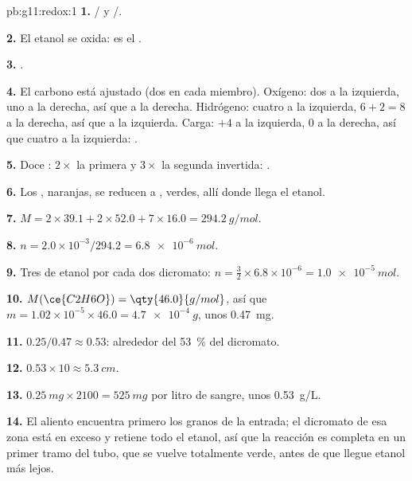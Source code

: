 \begin{solution}{pb:g11:redox:1}
\textbf{1.} / y /.

\textbf{2.} El etanol se oxida: es el .

\textbf{3.} .

\textbf{4.} El carbono está ajustado (dos en cada miembro). Oxígeno:
dos a la izquierda, uno a la derecha, así que  a la derecha.
Hidrógeno: cuatro a la izquierda, $6 + 2 = 8$ a la derecha, así que
 a la izquierda. Carga: $+4$ a la izquierda, 0 a la derecha,
así que cuatro  a la izquierda:
.

\textbf{5.} Doce : $2\times$ la primera y $3\times$ la segunda
invertida:
.

\textbf{6.} Los  , naranjas, se reducen a 
, verdes, allí donde llega el etanol.

\textbf{7.} $M = 2\times 39.1 + 2\times 52.0 + 7\times 16.0 =
\qty{294.2}{g/mol}$.

\textbf{8.} $n = 2.0\times 10^{-3}/294.2 = \qty{6.8e-6}{mol}$.

\textbf{9.} Tres  de etanol por cada dos  dicromato:
$n = \tfrac{3}{2}\times 6.8\times 10^{-6} = \qty{1.0e-5}{mol}$.

\textbf{10.} $M(\ce{C2H6O}) = \qty{46.0}{g/mol}$, así que
$m = 1.02\times 10^{-5}\times 46.0 = \qty{4.7e-4}{g}$, unos
\qty{0.47}{mg}.

\textbf{11.} $0.25/0.47 \approx 0.53$: alrededor del \qty{53}{\percent}
del dicromato.

\textbf{12.} $0.53 \times 10 \approx \qty{5.3}{cm}$.

\textbf{13.} $\qty{0.25}{mg} \times 2100 = \qty{525}{mg}$ por litro de
sangre, unos \qty{0.53}{g/L}.

\textbf{14.} El aliento encuentra primero los granos de la entrada; el
dicromato de esa zona está en exceso y retiene todo el etanol, así que
la reacción es completa en un primer tramo del tubo, que se vuelve
totalmente verde, antes de que llegue etanol más lejos.


\end{solution}
